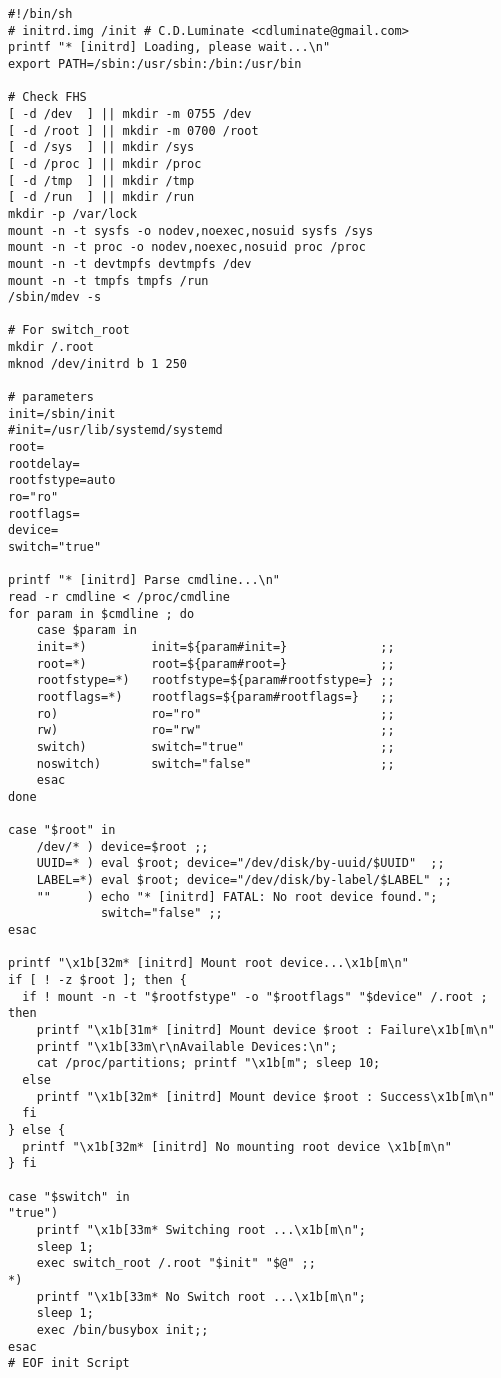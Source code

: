 \begin{framed}\begin{verbatim}
#!/bin/sh
# initrd.img /init # C.D.Luminate <cdluminate@gmail.com>
printf "* [initrd] Loading, please wait...\n"
export PATH=/sbin:/usr/sbin:/bin:/usr/bin

# Check FHS
[ -d /dev  ] || mkdir -m 0755 /dev
[ -d /root ] || mkdir -m 0700 /root
[ -d /sys  ] || mkdir /sys
[ -d /proc ] || mkdir /proc
[ -d /tmp  ] || mkdir /tmp
[ -d /run  ] || mkdir /run
mkdir -p /var/lock
mount -n -t sysfs -o nodev,noexec,nosuid sysfs /sys
mount -n -t proc -o nodev,noexec,nosuid proc /proc
mount -n -t devtmpfs devtmpfs /dev
mount -n -t tmpfs tmpfs /run
/sbin/mdev -s

# For switch_root
mkdir /.root
mknod /dev/initrd b 1 250

# parameters
init=/sbin/init
#init=/usr/lib/systemd/systemd
root=
rootdelay=
rootfstype=auto
ro="ro"
rootflags=
device=
switch="true"

printf "* [initrd] Parse cmdline...\n"
read -r cmdline < /proc/cmdline
for param in $cmdline ; do
    case $param in
    init=*)         init=${param#init=}             ;;
    root=*)         root=${param#root=}             ;;
    rootfstype=*)   rootfstype=${param#rootfstype=} ;;
    rootflags=*)    rootflags=${param#rootflags=}   ;;
    ro)             ro="ro"                         ;;
    rw)             ro="rw"                         ;;
    switch)         switch="true"                   ;;
    noswitch)       switch="false"                  ;;
    esac
done

case "$root" in
    /dev/* ) device=$root ;;
    UUID=* ) eval $root; device="/dev/disk/by-uuid/$UUID"  ;;
    LABEL=*) eval $root; device="/dev/disk/by-label/$LABEL" ;;
    ""     ) echo "* [initrd] FATAL: No root device found.";
             switch="false" ;;
esac

printf "\x1b[32m* [initrd] Mount root device...\x1b[m\n"
if [ ! -z $root ]; then {
  if ! mount -n -t "$rootfstype" -o "$rootflags" "$device" /.root ; then
    printf "\x1b[31m* [initrd] Mount device $root : Failure\x1b[m\n"
    printf "\x1b[33m\r\nAvailable Devices:\n";
    cat /proc/partitions; printf "\x1b[m"; sleep 10;
  else
    printf "\x1b[32m* [initrd] Mount device $root : Success\x1b[m\n"
  fi
} else {
  printf "\x1b[32m* [initrd] No mounting root device \x1b[m\n"
} fi

case "$switch" in
"true")
    printf "\x1b[33m* Switching root ...\x1b[m\n";
    sleep 1;
    exec switch_root /.root "$init" "$@" ;;
*)
    printf "\x1b[33m* No Switch root ...\x1b[m\n";
    sleep 1;
    exec /bin/busybox init;;
esac
# EOF init Script
\end{verbatim}\end{framed}

